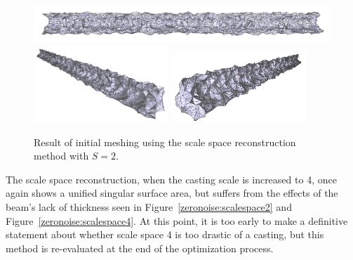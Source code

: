 \documentclass[12pt]{drexelthesis}
\begin{document}
\begin{figure}[!ht] 
	\centering
		\includegraphics[width=5in]{simulated-lab-scan/2cmnoise/2cmmeshNeat/scalespace200.png}
		\includegraphics[width=2in]{simulated-lab-scan/2cmnoise/2cmmeshNeat/scalespace201.png}
		\includegraphics[width=2in]{simulated-lab-scan/2cmnoise/2cmmeshNeat/scalespace202.png}
		\caption[Initial meshing using a scale space reconstruction with $S = 2$]{\centering  Result of initial meshing using the scale space reconstruction method with $S = 2$.}
		\label{2cmnoise:scalepspace2}
\end{figure}

The scale space reconstruction, when the casting scale is increased to 4, once again shows a unified singular surface area, but suffers from the effects of the beam's lack of thickness seen in Figure~\ref{zeronoise:scalespace2} and Figure~\ref{zeronoise:scalespace4}. At this point, it is too early to make a definitive statement about whether scale space 4 is too drastic of a casting, but this method is re-evaluated  at the end of the optimization process.
\end{document}

